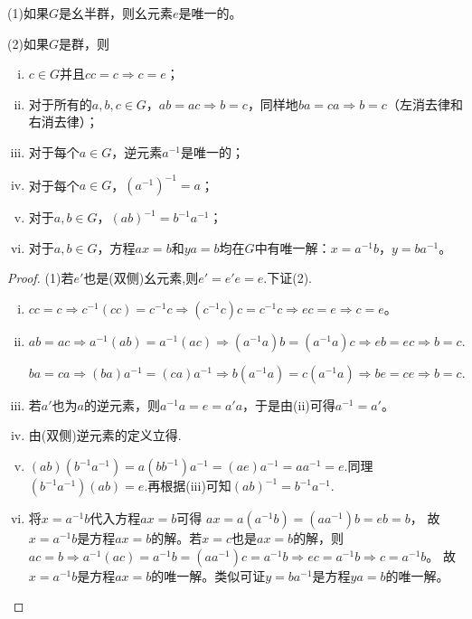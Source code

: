 \documentclass[../../main.tex]{subfiles}
\begin{document}
\begin{theorem}\label{theorem:(幺半)群的基本性质}
(1)如果$G$是幺半群，则幺元素$e$是唯一的。

(2)如果$G$是群，则
\begin{enumerate}[(i)]
\item $c \in G$并且$cc = c \Rightarrow c = e$；

\item 对于所有的$a, b, c \in G$，$ab = ac \Rightarrow b = c$，同样地$ba = ca \Rightarrow b = c$（左消去律和右消去律）；

\item 对于每个$a \in G$，逆元素$a^{-1}$是唯一的；

\item 对于每个$a \in G$，$(a^{-1})^{-1} = a$；

\item 对于$a, b \in G$，$(ab)^{-1} = b^{-1}a^{-1}$；

\item 对于$a, b \in G$，方程$ax = b$和$ya = b$均在$G$中有唯一解：$x = a^{-1}b$，$y = ba^{-1}$。
\end{enumerate}
\end{theorem}
\begin{proof}
(1)若$e'$也是(双侧)幺元素,则$e'=e'e=e$.下证(2).

\begin{enumerate}[(i)]
\item $cc = c \Rightarrow c^{-1}(cc) = c^{-1}c \Rightarrow (c^{-1}c)c = c^{-1}c \Rightarrow ec = e \Rightarrow c = e$。

\item $ab=ac\Rightarrow a^{-1}(ab)=a^{-1}(ac)\Rightarrow (a^{-1}a)b=(a^{-1}a)c\Rightarrow eb=ec\Rightarrow b=c.$

$ba=ca\Rightarrow (ba)a^{-1}=(ca)a^{-1}\Rightarrow b(a^{-1}a)=c(a^{-1}a)\Rightarrow be=ce\Rightarrow b=c.$

\item 若$a'$也为$a$的逆元素，则$a^{-1}a=e=a'a$，于是由(ii)可得$a^{-1}=a'$。

\item 由(双侧)逆元素的定义立得.

\item $(ab)(b^{-1}a^{-1}) = a(bb^{-1})a^{-1} = (ae)a^{-1} = aa^{-1} = e $.同理$(b^{-1}a^{-1})(ab) = e$.再根据(iii)可知$(ab)^{-1} = b^{-1}a^{-1}$.

\item 将$x=a^{-1}b$代入方程$ax=b$可得
$ax=a\left( a^{-1}b \right) =\left( aa^{-1} \right) b=eb=b$，
故$x=a^{-1}b$是方程$ax=b$的解。若$x=c$也是$ax=b$的解，则
$ac=b\Rightarrow a^{-1}\left( ac \right) =a^{-1}b=\left( aa^{-1} \right) c=a^{-1}b\Rightarrow ec=a^{-1}b\Rightarrow c=a^{-1}b$。
故$x=a^{-1}b$是方程$ax=b$的唯一解。类似可证$y=ba^{-1}$是方程$ya=b$的唯一解。
\end{enumerate}
\end{proof}
\end{document}
